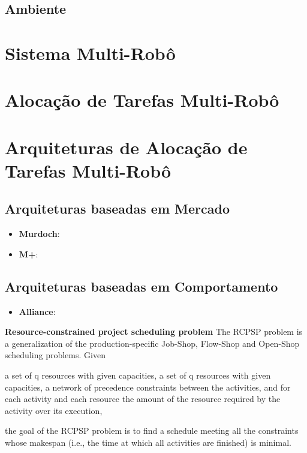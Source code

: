 \subsection{Ambiente}

\section{Sistema Multi-Robô}

\section{Alocação de Tarefas Multi-Robô}

\section{Arquiteturas de Alocação de Tarefas Multi-Robô}

\subsection{Arquiteturas baseadas em Mercado}

\begin{itemize}
    \item \textbf{Murdoch}:
    \item \textbf{M+}:
\end{itemize}

\subsection{Arquiteturas baseadas em Comportamento}

\begin{itemize}
    \item \textbf{Alliance}:
    
\end{itemize}


\textbf{Resource-constrained project scheduling problem}
The RCPSP problem is a generalization of the production-specific Job-Shop, Flow-Shop and Open-Shop scheduling problems. Given

    a set of q resources with given capacities,
    a set of q resources with given capacities,
    a network of precedence constraints between the activities, and
    for each activity and each resource the amount of the resource required by the activity over its execution,

the goal of the RCPSP problem is to find a schedule meeting all the constraints whose makespan (i.e., the time at which all activities are finished) is minimal.


